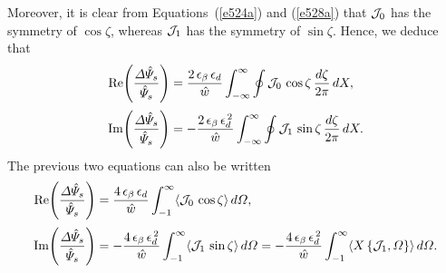 \documentclass[notitlepage,12pt]{article}
\begin{document}
Moreover, it is clear from Equations~(\ref{e524a}) and (\ref{e528a}) that ${\cal J}_0$ has the symmetry of $\cos\zeta$,
whereas ${\cal J}_1$ has the symmetry of $\sin\zeta$. 
Hence, we deduce that
\begin{align}
{\rm Re}\!\left(\frac{{\mit\Delta}\hat{\mit\Psi}_s}{\hat{\mit\Psi}_s}\right)&=\frac{2\,\epsilon_\beta\,\epsilon_d}{\hat{w}}\int_{-\infty}^{\infty}\oint
{\cal J}_0\,\cos\zeta\,\frac{d\zeta}{2\pi}\,dX,\\[0.5ex]
{\rm Im}\!\left(\frac{{\mit\Delta}\hat{\mit\Psi}_s}{\hat{\mit\Psi}_s}\right)&=-\frac{2\,\epsilon_\beta\,\epsilon_d^{\,2}}{\hat{w}}\int_{-\infty}^{\infty}\oint
{\cal J}_1\,\sin\zeta\,\frac{d\zeta}{2\pi}\,dX.
\end{align}
The previous two equations can also be written
\begin{align}
{\rm Re}\!\left(\frac{{\mit\Delta}\hat{\mit\Psi}_s}{\hat{\mit\Psi}_s}\right)&=\frac{4\,\epsilon_\beta\,\epsilon_d}{\hat{w}}\int_{-1}^\infty
\langle {\cal J}_0\,\cos\zeta\rangle\,d{\mit\Omega},\label{e542}\\[0.5ex]
{\rm Im}\!\left(\frac{{\mit\Delta}\hat{\mit\Psi}_s}{\hat{\mit\Psi}_s}\right)&=-\frac{4\,\epsilon_\beta\,\epsilon_d^{\,2}}{\hat{w}}\int_{-1}^\infty
\langle {\cal J}_1\,\sin\zeta\rangle\,d{\mit\Omega}=-\frac{4\,\epsilon_\beta\,\epsilon_d^{\,2}}{\hat{w}}\int_{-1}^\infty
\langle X\,\{{\cal J}_1,{\mit\Omega}\}\rangle\,d{\mit\Omega}.\label{e543}
\end{align}
\end{document}
